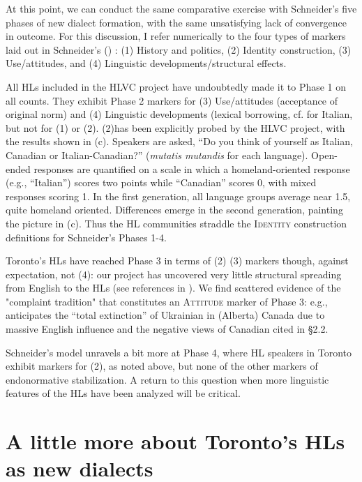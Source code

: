 \documentclass[output=paper]{LSP/langsci}
\begin{document}
At this point, we can conduct the same comparative exercise with Schneider’s five phases of new dialect formation, with the same unsatisfying lack of convergence in outcome. For this discussion, I refer numerically to the four types of markers laid out in Schneider’s (\citeyear[255]{schneider_dynamics_2003}) :  {(1) History and politics, (2) Identity construction, (3) Use/attitudes}, and { (4) Linguistic developments/structural effects.}

All HLs included in the HLVC project have undoubtedly made it to Phase 1 on all counts. They exhibit Phase 2 markers for  {(3) Use/attitudes} (acceptance of original norm) and (4) Linguistic developments (lexical borrowing, cf. \citet{danesi_canadian_1983} for Italian, but not for  (1) or  (2). (2)has been explicitly probed by the HLVC project, with the results shown in  (c). Speakers are asked, “Do you think of yourself as Italian, Canadian or Italian-Canadian?” (\textit{mutatis mutandis} for each language). Open-ended responses are quantified on a scale in which a homeland-oriented response (e.g., “Italian”) scores two points while “Canadian” scores 0, with mixed responses scoring 1. In the first generation, all language groups average near 1.5, quite homeland oriented. Differences emerge in the second generation, painting the picture in  (c). Thus the HL communities straddle the \textsc{Identity} construction definitions for Schneider’s Phases 1-4. 

\largerpage
Toronto’s HLs have reached %
 Phase 3 in terms of (2) (3) markers though, against expectation, not  (4): our project has uncovered very little structural spreading from English to the HLs (see references in ). We find scattered evidence of the "complaint tradition" that constitutes an \textsc{Attitude} marker of Phase 3: e.g., \citet{struk_between_2000} anticipates the “total extinction” of Ukrainian in (Alberta) Canada due to massive English influence and the negative views of Canadian  cited in §2.2. 

Schneider’s model unravels a bit more at Phase 4, where HL speakers in Toronto exhibit markers for (2), as noted above, but none of the other markers of endonormative stabilization. A return to this question when more linguistic features of the HLs have been analyzed will be critical.

\section{A little more about Toronto’s HLs as new dialects}
\end{document}
